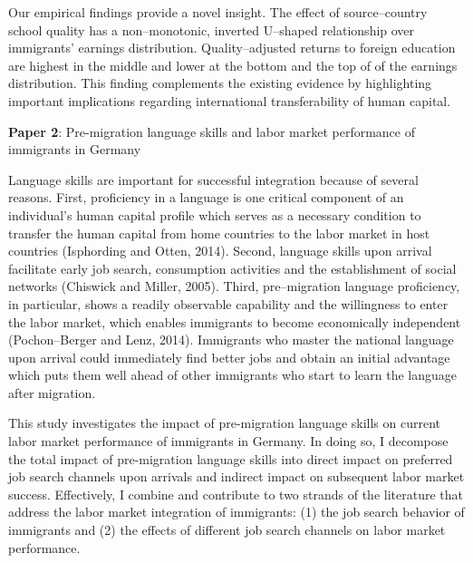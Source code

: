 \documentclass[a4paper, 10pt]{article} %
\begin{document}
Our empirical findings provide a novel insight. The effect of source--country school quality has a non--monotonic, inverted U--shaped relationship over immigrants' earnings distribution. Quality--adjusted returns to foreign education are highest in the middle and lower at the bottom and the top of of the earnings distribution. This finding complements the existing evidence by highlighting important implications regarding international transferability of human capital.

\vspace{10pt}

\textbf{Paper 2}: Pre-migration language skills and labor market performance of immigrants in Germany

\vspace{10pt}

Language skills are important for successful integration because of several reasons. First, proficiency in a language is one critical component of an individual's human capital profile which serves as a necessary condition to transfer the human capital from home countries to the labor market in host countries (Isphording and Otten, 2014). Second, language skills upon arrival facilitate early job search, consumption activities and the establishment of social networks (Chiswick and Miller, 2005). Third, pre--migration language proficiency, in particular, shows a readily observable capability and the willingness to enter the labor market, which enables immigrants to become economically independent (Pochon--Berger and Lenz, 2014). Immigrants who master the national language upon arrival could immediately find better jobs and obtain an initial advantage which puts them well ahead of other immigrants who start to learn the language after migration.

This study investigates the impact of pre-migration language skills on current labor market performance of immigrants in Germany. In doing so, I decompose the total impact of pre-migration language skills into direct impact on preferred job search channels upon arrivals and indirect impact on subsequent labor market success. Effectively, I combine and contribute to two strands of the literature that address the labor market integration of immigrants: (1) the job search behavior of immigrants and (2) the effects of different job search channels on labor market performance. 
\end{document}
